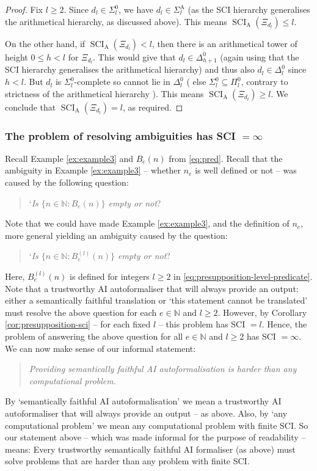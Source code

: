 \documentclass[10pt, a4paper, reqno]{amsart}
\numberwithin{equation}{section}
\renewcommand{\geq}{\geqslant}
\renewcommand{\leq}{\leqslant}
\newcommand{\SCI}{\operatorname{SCI}}
\theoremstyle{definition}
\theoremstyle{definition}
\begin{document}
\begin{proof}
Fix $l \geq 2$. Since $d_l \in \Sigma_{l}^{0}$, we have $d_l \in \Sigma_{l}^{\mathrm A}$ (as the SCI hierarchy generalises the arithmetical hierarchy, as discussed above). This means $\SCI_{\mathrm A}(\Xi_{d_l}) \leq l$.

On the other hand, if $\SCI_{\mathrm A}(\Xi_{d_l}) < l$, then there is an arithmetical tower of height $0 \leq h < l$ for $\Xi_{d_l}$. This would give that $d_l \in \Delta_{h+1}^{0}$ (again using that the SCI hierarchy generalises the arithmetical hierarchy) and thus also $d_l \in \Delta_{l}^{0}$ since $h < l$. But $d_l$ is $\Sigma_{l}^{0}$-complete so cannot lie in $\Delta_{l}^{0}$ ( else $\Sigma_{l}^{0} \subseteq \Pi_{l}^{0}$, contrary to strictness of the arithmetical hierarchy \cite[Corollary~4.2.3, p.~85]{Soare2016}).
This means $\SCI_{\mathrm{A}}(\Xi_{d_l}) \geq l$. We conclude that $\SCI_{\mathrm{A}}(\Xi_{d_l}) = l$, as required.
\end{proof}

\subsubsection{The problem of resolving ambiguities has SCI $= \infty$}\label{sec:ambSCI}
Recall Example \ref{ex:example3} and $B_e(n)$ from \eqref{eq:pred}. Recall that the ambiguity in Example \ref{ex:example3} -- whether $n_e$ is well defined or not -- was caused by the following question:
\begin{quote}
	`\textit{Is $\{n\in\mathbb{N}:B_e(n)\}$ empty or not}?
\end{quote}
Note that we could have made Example \ref{ex:example3}, and the definition of $n_e$, more general yielding an ambiguity caused by the question:
\begin{quote}
	`\textit{Is $\{n\in\mathbb{N}:B^{(l)}_e(n)\}$ empty or not}? 
\end{quote}
  Here, $B^{(l)}_e(n)$ is defined for integers $l \geq 2$ in \eqref{eq:presupposition-level-predicate}. Note that a trustworthy AI autoformaliser that will always provide an output: either a semantically faithful translation or `this statement cannot be translated' must resolve the above question for each $e \in \mathbb{N}$ and $l \geq 2$. However, by Corollary \ref{cor:presupposition-sci} -- for each fixed $l$ -- this problem has SCI $= l$. Hence, the problem of answering the above question for all $e \in \mathbb{N}$ and $l \geq 2$ has SCI $= \infty$. 
  We can now make sense of our informal statement:
 \begin{quote}
	\emph{
		Providing semantically faithful AI autoformalisation is harder than any computational problem. 
	}
\end{quote}
 By `semantically faithful AI autoformalisation' we mean a trustworthy AI autoformaliser that will always provide an output -- as above. Also, by `any computational problem' we mean any computational problem with finite SCI.  So our statement above -- which was made informal for the purpose of readability -- means: Every trustworthy semantically faithful AI formaliser (as above) must solve problems that are harder than any problem with finite SCI.
 
\end{document}
